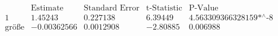 \[\begin{array}{l|llll}
 \text{} & \text{Estimate} & \text{Standard Error} & \text{t-Statistic} & \text{P-Value} \\
\hline
 1 & 1.45243 & 0.227138 & 6.39449 & \text{4.563309366328159$\grave{ }$*${}^{\wedge}$-8} \\
 \text{gr{\" o}{\ss}e} & -0.00362566 & 0.0012908 & -2.80885 & 0.006988 \\
\end{array}\]

